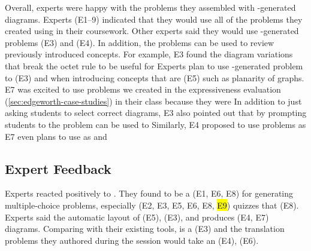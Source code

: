 Overall, experts were happy with the problems they assembled with \Edgeworth-generated diagrams. Experts (E1--9) indicated that they would use all of the problems they created using \Edgeworth in their coursework. Other experts said they would use \Edgeworth-generated problems  (E3) and  (E4). In addition, the problems can be used to review previously introduced concepts. For example, E3 found the diagram variations that break the octet rule to be useful for  Experts plan to use \Edgeworth-generated problem to  (E3) and when introducing concepts that are  (E5) such as planarity of graphs. E7 was excited to use problems we created in the expressiveness evaluation (\cref{sec:edgeworth-case-studies}) in their class because they were  In addition to just asking students to select correct diagrams, E3 also pointed out that by prompting students to  the problem can be used to  Similarly, E4 proposed to use \Edgeworth problems as  E7 even plans to use \Edgeworth as  and  

\subsection{Expert Feedback}

Experts reacted positively to \Edgeworth. They found \Edgeworth to be a  (E1, E6, E8) for generating multiple-choice problems, especially  (E2, E3, E5, E6, E8, \hl{E9}) quizzes that  (E8). Experts said the automatic layout of \Edgeworth {} (E5),  (E3), and produces  (E4, E7) diagrams. Comparing with their existing tools, \Edgeworth is a  (E3) and the translation problems they authored during the session would take an  (E4),  (E6).

